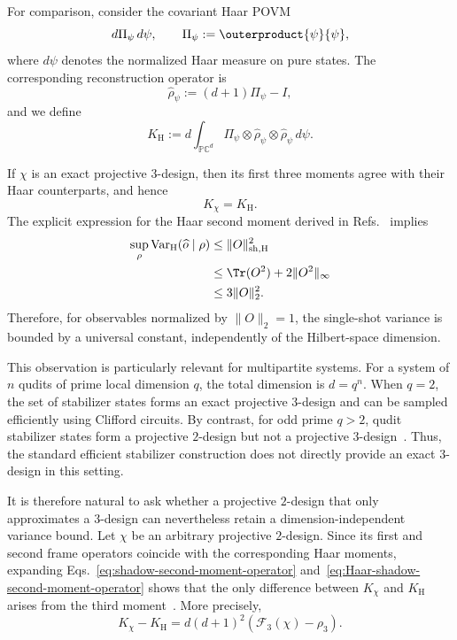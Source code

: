 \documentclass[aps,twocolumn,pra,superscriptaddress,nofootinbib]{revtex4-2}
\begin{document}
{For comparison, consider the covariant Haar POVM
\begin{equation}
    d\Pi_{\psi}\,d\psi,
    \qquad
    \Pi_{\psi}:=\outerproduct{\psi}{\psi},
\end{equation}
where $d\psi$ denotes the normalized Haar measure on pure states. The corresponding reconstruction operator is
\begin{equation}
    \widehat{\rho}_{\psi}
    :=
    (d+1)\Pi_{\psi}-I,
\end{equation}
and we define
\begin{equation}
    K_{\mathrm H}
    :=
    d\int_{\mathbb{P}\mathbb{C}^{d}}
    \Pi_{\psi}\otimes
    \widehat{\rho}_{\psi}\otimes
    \widehat{\rho}_{\psi}
    \,d\psi.
    \label{eq:Haar-shadow-second-moment-operator}
\end{equation}

If $\chi$ is an exact projective $3$-design, then its first three moments agree with their Haar counterparts, and hence
\begin{equation}
    K_{\chi}=K_{\mathrm H}.
\end{equation}
The explicit expression for the Haar second moment derived in Refs.~\cite{Huang2020Predicting,Innocenti2023} implies
\begin{align}
    \sup_{\rho}
    \operatorname{Var}_{\mathrm H}(\widehat{o}\mid\rho)
    &\leq
    \|O\|_{\mathrm{sh},\mathrm H}^{2}
    \nonumber\\
    &\leq
    \Tr(O^{2})+2\|O^{2}\|_{\infty}
    \nonumber\\
    &\leq
    3\|O\|_{2}^{2}.
    \label{eq:three-design-shadow-bound}
\end{align}
Therefore, for observables normalized by $\|O\|_{2}=1$, the single-shot variance is bounded by a universal constant, independently of the Hilbert-space dimension.

This observation is particularly relevant for multipartite systems. For a system of $n$ qudits of prime local dimension $q$, the total dimension is $d=q^{n}$. When $q=2$, the set of stabilizer states forms an exact projective $3$-design and can be sampled efficiently using Clifford circuits. By contrast, for odd prime $q>2$, qudit stabilizer states form a projective $2$-design but not a projective $3$-design~\cite{KuengGross2015Stabilizer}. Thus, the standard efficient stabilizer construction does not directly provide an exact $3$-design in this setting.

It is therefore natural to ask whether a projective $2$-design that only approximates a $3$-design can nevertheless retain a dimension-independent variance bound. Let $\chi$ be an arbitrary projective $2$-design. Since its first and second frame operators coincide with the corresponding Haar moments, expanding Eqs.~\eqref{eq:shadow-second-moment-operator} and~\eqref{eq:Haar-shadow-second-moment-operator} shows that the only difference between $K_{\chi}$ and $K_{\mathrm H}$ arises from the third moment~\cite{Innocenti2023}. More precisely,
\begin{equation}
    K_{\chi}-K_{\mathrm H}
    =
    d(d+1)^{2}
    \left(
        \mathcal{F}_{3}(\chi)-\rho_{3}
    \right).
    \label{eq:shadow-K-third-moment}
\end{equation}

}
\end{document}
